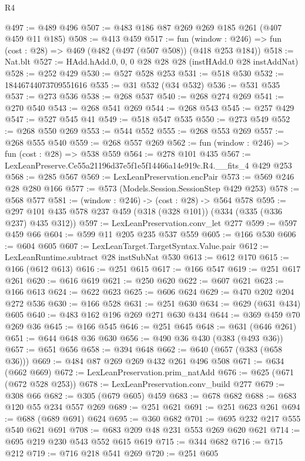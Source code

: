 \begin{lexlean}{R4}
\begin{coremodule}
@497 := @489 @496
@507 := @483 @186 @87 @269 @269 @185 @261 (@407 @459 @11 @185)
@508 := @413 @459
@517 := fun (window : @246) => fun (cost : @28) => @469 (@482 (@497 (@507 @508)) (@418 @253 @184))
@518 := Nat.blt
@527 := HAdd.hAdd.{0, 0, 0} @28 @28 @28 (instHAdd.{0} @28 instAddNat)
@528 := @252 @429
@530 := @527 @528 @253
@531 := @518 @530
@532 := 18446744073709551616
@535 := @31 @532 (@34 @532)
@536 := @531 @535
@537 := @273 @536
@538 := @268 @537
@540 := @268 @274 @269
@541 := @270 @540
@543 := @268 @541 @269
@544 := @268 @543
@545 := @257 @429
@547 := @527 @545 @41
@549 := @518 @547 @535
@550 := @273 @549
@552 := @268 @550 @269
@553 := @544 @552
@555 := @268 @553 @269
@557 := @268 @555 @540
@559 := @268 @557 @269
@562 := fun (window : @246) => fun (cost : @28) => @538 @559
@564 := @278 @101 @435
@567 := LexLeanPreserve.Ce55a21196d37e5f1e5f14466a14e919c.R4.__fits_4 @429 @253
@568 := @285 @567
@569 := LexLeanPreservation.encPair
@573 := @569 @246 @28 @280 @166
@577 := @573 (Models.Session.SessionStep @429 @253)
@578 := @568 @577
@581 := (window : @246) -> (cost : @28) -> @564 @578
@595 := @297 @101 @435 @578 @237 @459 (@318 (@328 @101)) (@334 (@335 (@336 @237) @435 @312))
@597 := LexLeanPreservation.conv_let @277
@599 := @597 @459 @66
@604 := @599 @11 @205 @235 @537 @559
@605 := @166 @530
@606 := @604 @605
@607 := LexLeanTarget.TargetSyntax.Value.pair
@612 := LexLeanRuntime.subtract @28 instSubNat @530
@613 := @612 @170
@615 := @166 (@612 @613)
@616 := @251 @615
@617 := @166 @547
@619 := @251 @617 @261
@620 := @616 @619
@621 := @250 @620
@622 := @607 @621
@623 := @166 @613
@624 := @622 @623
@625 := @606 @624
@629 := @470 @202 @204 @272 @536
@630 := @166 @528
@631 := @251 @630
@634 := @629 (@631 @434) @605
@640 := @483 @162 @196 @269 @271 @630 @434
@644 := @369 @459 @70 @269 @36
@645 := @166 @545
@646 := @251 @645
@648 := @631 (@646 @261)
@651 := @644 @648 @36 @630
@656 := @490 @36 @430 (@383 (@493 @36))
@657 := @651 @656
@658 := @394 @648
@662 := @640 (@657 (@383 (@658 @36)))
@669 := @484 @87 @269 @269 @432 @261 @496 @508
@671 := @634 (@662 @669)
@672 := LexLeanPreservation.prim_natAdd
@676 := @625 (@671 (@672 @528 @253))
@678 := LexLeanPreservation.conv_build @277
@679 := @308 @66
@682 := @305 (@679 @605) @459
@683 := @678 @682
@688 := @683 @120 @55 @234 @557 @269
@689 := @251 @621
@691 := @251 @623 @261
@694 := @688 (@689 @691) @624
@695 := @360 @682
@701 := @695 @232 @217 @555 @540 @621 @691
@708 := @683 @209 @48 @231 @553 @269 @620 @621
@714 := @695 @219 @230 @543 @552 @615 @619
@715 := @344 @682
@716 := @715 @212
@719 := @716 @218 @541 @269
@720 := @251 @605

\end{coremodule}
\end{lexlean}
